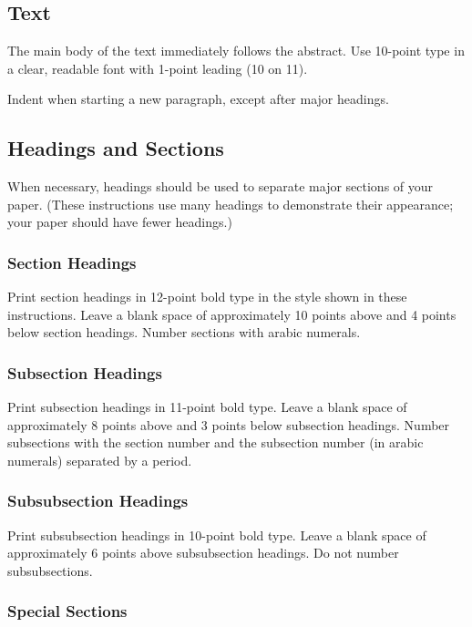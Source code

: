\documentclass{article}
\theoremstyle{definition}
\begin{document}
\subsection{Text}

The main body of the text immediately follows the abstract. Use
10-point type in a clear, readable font with 1-point leading (10 on
11).

Indent when starting a new paragraph, except after major headings.

\subsection{Headings and Sections}

When necessary, headings should be used to separate major sections of
your paper. (These instructions use many headings to demonstrate their
appearance; your paper should have fewer headings.)

\subsubsection{Section Headings}

Print section headings in 12-point bold type in the style shown in
these instructions. Leave a blank space of approximately 10 points
above and 4 points below section headings.  Number sections with
arabic numerals.

\subsubsection{Subsection Headings}

Print subsection headings in 11-point bold type. Leave a blank space
of approximately 8 points above and 3 points below subsection
headings. Number subsections with the section number and the
subsection number (in arabic numerals) separated by a
period.

\subsubsection{Subsubsection Headings}

Print subsubsection headings in 10-point bold type. Leave a blank
space of approximately 6 points above subsubsection headings. Do not
number subsubsections.

\subsubsection{Special Sections}
\end{document}
